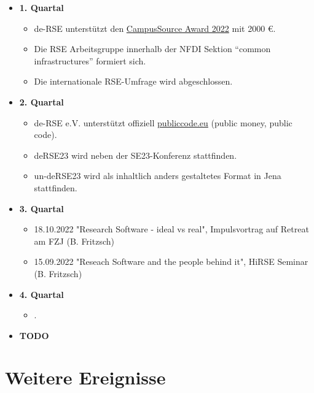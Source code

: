 \begin{itemize}
 \item \textbf{1. Quartal}
   \begin{itemize}
     \item de-RSE unterstützt den \href{https://ev.campussource.de/publikationen/csa2022/}{CampusSource Award 2022} mit 2000 €.
     \item Die RSE Arbeitsgruppe innerhalb der NFDI Sektion "`common infrastructures"' formiert sich.
     \item Die internationale RSE-Umfrage wird abgeschlossen.
   \end{itemize}
 \item \textbf{2. Quartal}
   \begin{itemize}
    \item de-RSE e.V. unterstützt offiziell \href{https://publiccode.eu}{publiccode.eu} (public money, public code).
    \item deRSE23 wird neben der SE23-Konferenz stattfinden.
    \item un-deRSE23 wird als inhaltlich anders gestaltetes Format in Jena stattfinden.
   \end{itemize}
 \item \textbf{3. Quartal}
   \begin{itemize}
    \item 18.10.2022 "Research Software - ideal vs real", Impulsvortrag auf Retreat am FZJ (B. Fritzsch) 
    \item 15.09.2022 "Reseach Software and the people behind it", HiRSE Seminar (B. Fritzsch)
   \end{itemize}
 \item \textbf{4. Quartal}
   \begin{itemize}
    \item .
   \end{itemize}
 \item \textbf{TODO}
\end{itemize}

\section{Weitere Ereignisse}

